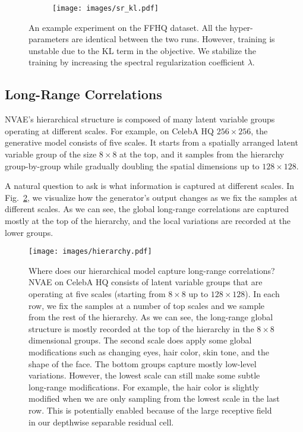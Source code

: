 \documentclass{article}
\begin{document}
\begin{figure}[!h]
\centering
\begin{subfigure}[b]{.99\textwidth}
\centering
\texttt{[image: images/sr\_kl.pdf]}
\end{subfigure} 
\caption{An example experiment on the FFHQ dataset. All the hyper-parameters are identical between the two runs. However, training is unstable due to the KL term in the objective. We stabilize the training by increasing the spectral regularization coefficient $\lambda$. }
\label{fig:sr_stable}
\vspace{-0.3cm}
\end{figure} 
\subsection{Long-Range Correlations}\label{app:scales}
NVAE's hierarchical structure is composed of many latent variable groups operating at different scales. For example, on CelebA HQ $256\times 256$, the generative model consists of five scales. It starts from a spatially arranged latent variable group of the size $8\times 8$ at the top, and it samples from the hierarchy group-by-group while gradually doubling the spatial dimensions up to $128\times 128$. 

A natural question to ask is what information is captured at different scales. In Fig.~\ref{fig:scales}, we visualize how the generator's output changes as we fix the samples at different scales. As we can see, the global long-range correlations are captured mostly at the top of the hierarchy, and the local variations are recorded at the lower groups.

\begin{figure}[!h]
\centering
\texttt{[image: images/hierarchy.pdf]}
\caption{Where does our hierarchical model capture long-range correlations? NVAE on CelebA HQ consists of latent variable groups that are operating at five scales (starting from $8\times8$ up to $128\times128$). In each row, we fix the samples at a number of top scales and we sample from the rest of the hierarchy. As we can see, the long-range global structure is mostly recorded at the top of the hierarchy in the $8\times8$ dimensional groups. The second scale does apply some global modifications such as changing eyes, hair color, skin tone, and the shape of the face. The bottom groups capture mostly low-level variations. However, the lowest scale can still make some subtle long-range modifications. For example, the hair color is slightly modified when we are only sampling from the lowest scale in the last row. This is potentially enabled because of the large receptive field in our depthwise separable residual cell.}
\label{fig:scales}
\vspace{-0.3cm}
\end{figure}  
\end{document}
